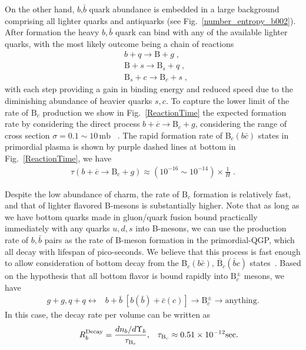 On the other hand, $b$,$\bar b$ quark abundance is embedded in a large background comprising all lighter quarks and antiquarks (see Fig.~\ref{number_entropy_b002}). After formation the heavy $b, \bar b$ quark can bind with any of the available lighter quarks, with the most likely outcome being a chain of reactions 
\begin{align}
&b+q\longrightarrow\mathrm{B}+g\;,\\
&\mathrm{B}+s\longrightarrow\mathrm{B}_s+q\;,\\
&\mathrm{B}_s+c\longrightarrow\mathrm{B}_c+s\;,
\end{align}
with each step providing a gain in binding energy and reduced speed due to the diminishing abundance of heavier quarks $s, c$. To capture the lower limit of the rate of $\mathrm{B}_c$ production we show in Fig.~\ref{ReactionTime} the expected formation rate by considering the direct process $b+\overline c\rightarrow \mathrm{B}_c+g$, considering the range of cross section $\sigma=0.1\sim10\,\mathrm{mb}$ ~\cite{Schroedter:2000ek}. The rapid formation rate of B$_c(b\bar c)$ states in primordial plasma is shown by purple dashed lines at bottom in Fig.~\ref{ReactionTime}, we have
\begin{align}
\tau (b+\overline c\rightarrow \mathrm{B}_c+g)\approx(10^{-16}\sim10^{-14})\times\frac{1}{H} \;.
\end{align}

Despite the low abundance of charm, the rate of $\mathrm{B}_c$ formation is relatively fast, and that of lighter flavored B-mesons is substantially higher. Note that as long as we have bottom quarks made in gluon/quark fusion bound practically immediately with any quarks $u, d, s$ into B-mesons, we can use the production rate of $b, \bar b$ pairs as the rate of B-meson formation in the primordial-QGP, which all decay with lifespan of pico-seconds. We believe that this process is fast enough to allow consideration of bottom decay from the B$_c(b\bar c)$, $\overline{\mathrm{B}}_c(\bar b c)$ states~\cite{Yang:2020nne}.  
 Based on the hypothesis that all bottom flavor is bound rapidly into $\mathrm{B}_c^\pm$ mesons, we have 
\begin{align}\label{Bc_source}
g+g, q+q \longleftrightarrow &b+\bar b\;[b(\bar{b})+\bar{c}(c)]\longrightarrow \mathrm{B}_c^\pm\longrightarrow\mathrm{anything}.
\end{align}
In this case, the decay rate per volume can be written as
\begin{align}\hspace{0.5cm}
 R^{\mathrm{Decay}}_b=\frac{dn_b/d\Upsilon_b}{\tau_{\mathrm{B}_c}},\,\,\,\,\, \tau_{\mathrm{B}_c}\approx0.51\times10^{-12} \mathrm{sec}.
 \end{align}



